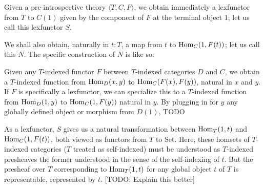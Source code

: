 \begin{construction}
Given a pre-introspective theory $\langle T, C, F \rangle$, we obtain immediately a lexfunctor from $T$ to $C(1)$ given by the component of $F$ at the terminal object $1$; let us call this lexfunctor $S$.

We shall also obtain, naturally in $t : T$, a map from $t$ to $\mathrm{Hom}_C(1, F(t))$; let us call this $N$. The specific construction of $N$ is like so: 

Given any $T$-indexed functor $F$ between $T$-indexed categories $D$ and $C$, we obtain a $T$-indexed function from $\mathrm{Hom}_D(x, y)$ to $\mathrm{Hom}_C(F(x), F(y))$, natural in $x$ and $y$. If $F$ is specifically a lexfunctor, we can specialize this to a $T$-indexed function from $\mathrm{Hom}_D(1, y)$ to $\mathrm{Hom}_C(1, F(y))$ natural in $y$. By plugging in for $y$ any globally defined object or morphism from $D(1)$, TODO

As a lexfunctor, $S$ gives us a natural transformation between $\mathrm{Hom}_T(1, t)$ and $\mathrm{Hom}_C(1, F(t))$, both viewed as functors from $T$ to Set. Here, these homsets of $T$-indexed categories ($T$ treated as self-indexed) must be understood as $T$-indexed presheaves the former understood in the sense of the self-indexing of $t$. But the presheaf over $T$ corresponding to $\mathrm{Hom}_T(1, t)$ for any global object $t$ of $T$ is representable, represented by $t$. [TODO: Explain this better]
\end{construction}